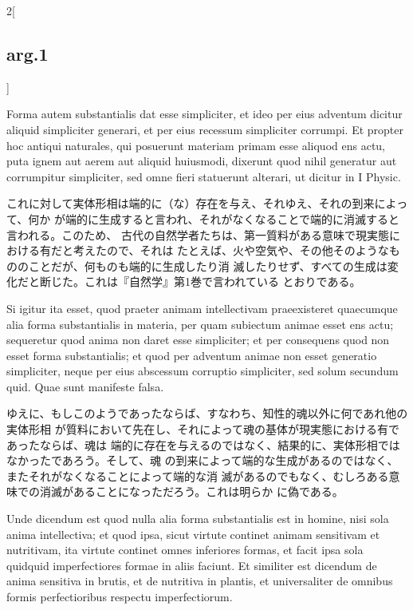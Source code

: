 \documentclass[paper=a4paper,fontsize=10pt,jafontsize=9pt,titlepage]{jlreq}
\begin{document}
\begin{paracol}{2}[\subsection{arg.1}]
\switchcolumn*

Forma autem substantialis dat esse simpliciter, et ideo per eius adventum
dicitur aliquid simpliciter generari, et per eius recessum simpliciter
corrumpi. Et propter hoc antiqui naturales, qui posuerunt materiam primam esse
aliquod ens actu, puta ignem aut aerem aut aliquid huiusmodi, dixerunt quod
nihil generatur aut corrumpitur simpliciter, sed omne fieri statuerunt alterari,
ut dicitur in I Physic.

\switchcolumn

これに対して実体形相は端的に（な）存在を与え、それゆえ、それの到来によって、何か
が端的に生成すると言われ、それがなくなることで端的に消滅すると言われる。このため、
古代の自然学者たちは、第一質料がある意味で現実態における有だと考えたので、それは
たとえば、火や空気や、その他そのようなもののことだが、何ものも端的に生成したり消
滅したりせず、すべての生成は変化だと断じた。これは『自然学』第1巻で言われている
とおりである。
 
\switchcolumn*

Si igitur ita esset, quod praeter animam intellectivam praeexisteret quaecumque
alia forma substantialis in materia, per quam subiectum animae esset ens actu;
sequeretur quod anima non daret esse simpliciter; et per consequens quod non
esset forma substantialis; et quod per adventum animae non esset generatio
simpliciter, neque per eius abscessum corruptio simpliciter, sed solum secundum
quid. Quae sunt manifeste falsa.

 \switchcolumn

ゆえに、もしこのようであったならば、すなわち、知性的魂以外に何であれ他の実体形相
が質料において先在し、それによって魂の基体が現実態における有であったならば、魂は
端的に存在を与えるのではなく、結果的に、実体形相ではなかったであろう。そして、魂
の到来によって端的な生成があるのではなく、またそれがなくなることによって端的な消
滅があるのでもなく、むしろある意味での消滅があることになっただろう。これは明らか
に偽である。
 
\switchcolumn*

Unde dicendum est quod nulla alia forma substantialis est in homine, nisi sola
anima intellectiva; et quod ipsa, sicut virtute continet animam sensitivam et
nutritivam, ita virtute continet omnes inferiores formas, et facit ipsa sola
quidquid imperfectiores formae in aliis faciunt. Et similiter est dicendum de
anima sensitiva in brutis, et de nutritiva in plantis, et universaliter de
omnibus formis perfectioribus respectu imperfectiorum.

\switchcolumn


\end{paracol}
\end{document}

